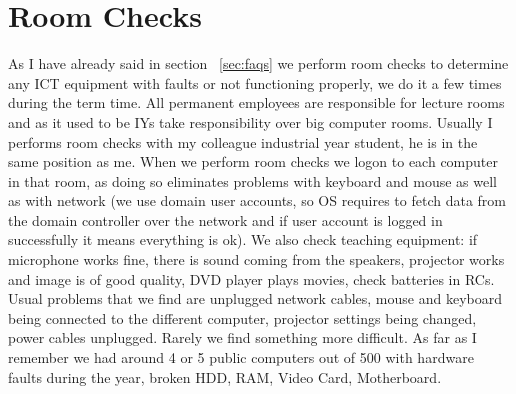 \documentclass[10pt,a4paper,headinclude=true]{report}
\begin{document}
\section{Room Checks}
As I have already said in section ~\ref{sec:faqs} we perform room checks to determine any ICT equipment with faults or not functioning properly, we do it a few times during the term time. All permanent employees are responsible for lecture rooms and as it used to be IYs take responsibility over big computer rooms. Usually I performs room checks with my colleague industrial year student, he is in the same position as me. When we perform room checks we logon to each computer in that room, as doing so eliminates problems with keyboard and mouse as well as with network (we use domain user accounts, so OS requires to fetch data from the domain controller over the network and if user account is logged in successfully it means everything is ok). We also check teaching equipment: if microphone works fine, there is sound coming from the speakers, projector works and image is of good quality, DVD player plays movies, check batteries in RCs. Usual problems that we find are unplugged network cables, mouse and keyboard being connected to the different computer, projector settings being changed, power cables unplugged. Rarely we find something more difficult. As far as I remember we had around 4 or 5 public computers out of 500 with hardware faults during the year, broken HDD, RAM, Video Card, Motherboard. 
\end{document}
